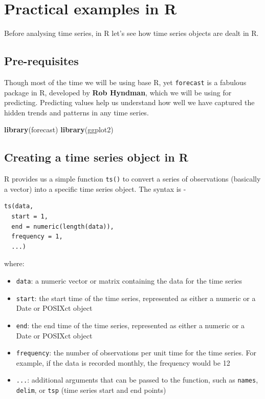 \documentclass[
]{book}
\newenvironment{Shaded}{\begin{snugshade}}{\end{snugshade}}
\newcommand{\FunctionTok}[1]{\textcolor[rgb]{0.13,0.29,0.53}{\textbf{#1}}}
\newcommand{\NormalTok}[1]{#1}
\providecommand{\tightlist}{%
  \setlength{\itemsep}{0pt}\setlength{\parskip}{0pt}}
\begin{document}
\hypertarget{practical-examples-in-r}{%
\section{Practical examples in R}\label{practical-examples-in-r}}

Before analysing time series, in R let's see how time series objects are dealt in R.

\hypertarget{pre-requisites}{%
\subsection*{Pre-requisites}\label{pre-requisites}}

Though most of the time we will be using base R, yet \texttt{forecast} is a fabulous package in R, developed by \textbf{Rob Hyndman}, which we will be using for predicting. Predicting values help us understand how well we have captured the hidden trends and patterns in any time series.

\begin{Shaded}
\begin{Highlighting}[]
\FunctionTok{library}\NormalTok{(forecast)}
\FunctionTok{library}\NormalTok{(ggplot2)}
\end{Highlighting}
\end{Shaded}

\hypertarget{creating-a-time-series-object-in-r}{%
\subsection{Creating a time series object in R}\label{creating-a-time-series-object-in-r}}

R provides us a simple function \texttt{ts()} to convert a series of observations (basically a vector) into a specific time series object. The syntax is -

\begin{verbatim}
ts(data, 
  start = 1, 
  end = numeric(length(data)), 
  frequency = 1, 
  ...)
\end{verbatim}

where:

\begin{itemize}
\tightlist
\item
  \texttt{data}: a numeric vector or matrix containing the data for the time series
\item
  \texttt{start}: the start time of the time series, represented as either a numeric or a Date or POSIXct object
\item
  \texttt{end}: the end time of the time series, represented as either a numeric or a Date or POSIXct object
\item
  \texttt{frequency}: the number of observations per unit time for the time series. For example, if the data is recorded monthly, the frequency would be 12
\item
  \texttt{...}: additional arguments that can be passed to the function, such as \texttt{names}, \texttt{delim}, or \texttt{tsp} (time series start and end points)
\end{itemize}
\end{document}
